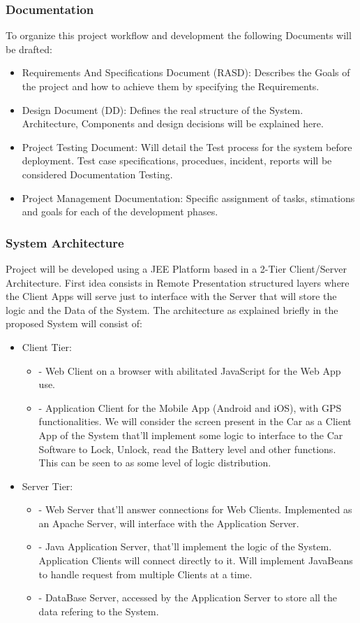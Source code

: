 \documentclass[a4paper]{article}
\begin{document}
\subsubsection{Documentation}
To organize this project workflow and development the following Documents will be drafted:
\begin {itemize}
\item Requirements And Specifications Document (RASD): Describes the Goals of the project and how to achieve them by specifying the Requirements.
\item Design Document (DD): Defines the real structure of the System. Architecture, Components and design decisions will be explained here.
\item Project Testing Document: Will detail the Test process for the system before deployment. Test case specifications, procedues, incident, reports will be considered Documentation Testing.
\item Project Management Documentation: Specific assignment of tasks, stimations and goals for each of the development phases.
\end{itemize}

\newpage
\subsubsection{System Architecture}
Project will be developed using a JEE Platform based in a 2-Tier Client/Server Architecture. First idea consists in Remote Presentation structured layers where the Client Apps will serve just to interface with the Server that will store the logic and the Data of the System. The architecture as explained briefly in the proposed System will consist of:
\begin {itemize}
\item Client Tier: 
\begin {itemize}
\item [-]Web Client on a browser with abilitated JavaScript for the Web App use. 
\item [-]Application Client for the Mobile App (Android and iOS), with GPS functionalities. We will consider the screen present in the Car as a Client App of the System that'll implement some logic to interface to the Car Software to Lock, Unlock, read the Battery level and other functions. This can be seen to as some level of logic distribution.
\end{itemize}
\item Server Tier:
\begin {itemize}
\item [-]Web Server that'll answer connections for Web Clients. Implemented as an Apache Server, will interface with the Application Server.
\item [-]Java Application Server, that'll implement the logic of the System. Application Clients will connect directly to it. Will implement JavaBeans to handle request from multiple Clients at a time.
\item [-]DataBase Server, accessed by the Application Server to store all the data refering to the System.
\end{itemize}
\end{itemize}
\end{document}
